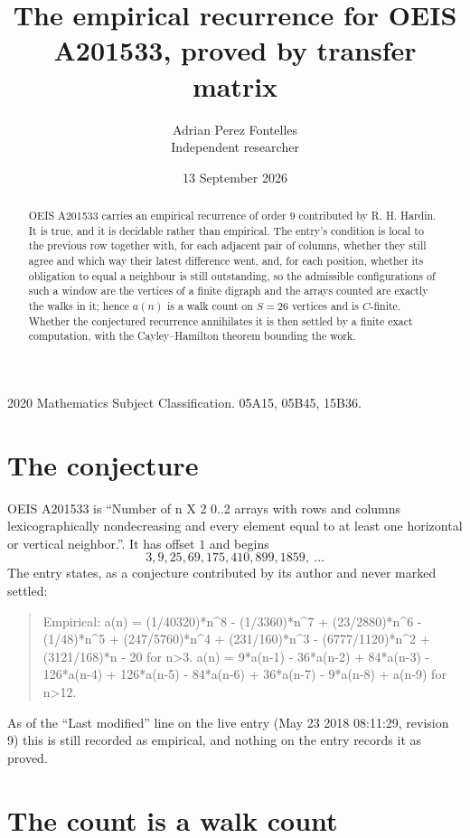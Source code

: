 \documentclass[11pt,a4paper]{article}
\title{The empirical recurrence for OEIS A201533, proved by transfer matrix}
\author{Adrian Perez Fontelles\\ \small Independent researcher}
\date{13 September 2026}
\theoremstyle{plain}
\theoremstyle{definition}
\begin{document}
\maketitle

\begin{abstract}
OEIS A201533 carries an empirical recurrence of order $9$ contributed by R. H. Hardin. It is
true, and it is decidable rather than empirical. The entry's condition is local to the previous row together with, for each adjacent pair of columns, whether they still agree and which way their latest difference went, and, for each position, whether its obligation to equal a neighbour is still outstanding, so
the admissible configurations of such a window are the vertices of a finite digraph and the
arrays counted are exactly the walks in it; hence $a(n)$ is a walk count on $S=26$ vertices
and is $C$-finite. Whether the conjectured recurrence annihilates it is then settled by a
finite exact computation, with the Cayley--Hamilton theorem bounding the work.
\end{abstract}

\noindent\small 2020 Mathematics Subject Classification. 05A15, 05B45, 15B36.\normalsize

\section{The conjecture}

OEIS A201533 is ``Number of n X 2 0..2 arrays with rows and columns lexicographically nondecreasing and every element equal to at least one horizontal or vertical neighbor.''. It has offset $1$ and begins
\[
3, 9, 25, 69, 175, 410, 899, 1859,\ \dots
\]
The entry states, as a conjecture contributed by its author and never marked settled:
\begin{quote}
Empirical: a(n) = (1/40320)*n\^{}8 - (1/3360)*n\^{}7 + (23/2880)*n\^{}6 - (1/48)*n\^{}5 + (247/5760)*n\^{}4 + (231/160)*n\^{}3 - (6777/1120)*n\^{}2 + (3121/168)*n - 20 for n>3. a(n) = 9*a(n-1) - 36*a(n-2) + 84*a(n-3) - 126*a(n-4) + 126*a(n-5) - 84*a(n-6) + 36*a(n-7) - 9*a(n-8) + a(n-9) for n>12.
\end{quote}
As of the ``Last modified'' line on the live entry (May 23 2018 08:11:29, revision 9) this is still
recorded as empirical, and nothing on the entry records it as proved.

\section{The count is a walk count}
\end{document}
